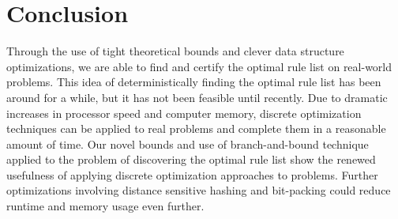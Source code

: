 \chapter{Conclusion}
\label{conclusion}

Through the use of tight theoretical bounds and clever data structure optimizations, we are able to find and certify the optimal rule list on real-world problems.
This idea of deterministically finding the optimal rule list has been around for a while, but it has not been feasible until recently.
Due to dramatic increases in processor speed and computer memory, discrete optimization techniques can be applied to real problems and complete them in a reasonable amount of time.
Our novel bounds and use of branch-and-bound technique applied to the problem of discovering the optimal rule list show the renewed usefulness of applying discrete optimization approaches to problems.
Further optimizations involving distance sensitive hashing and bit-packing could reduce runtime and memory usage even further.